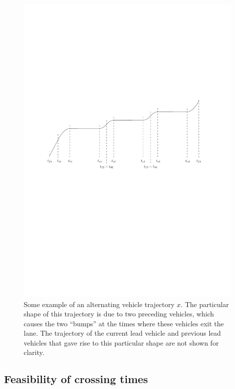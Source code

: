 \documentclass[a4paper]{article}
\theoremstyle{definition}
\theoremstyle{plain}
\begin{document}
\begin{figure}
  \centering
  \includegraphics[width=0.99\textwidth]{figures/motion/tandem_trajectory}
  \caption{Some example of an alternating vehicle trajectory $x$. The particular
    shape of this trajectory is due to two preceding vehicles, which causes the
    two ``bumps'' at the times where these vehicles exit the lane. The
    trajectory of the current lead vehicle and previous lead vehicles that gave
    rise to this particular shape are not shown for clarity.}
  \label{fig:tandem_trajectory}
\end{figure}


\subsection{Feasibility of crossing times}
\end{document}
